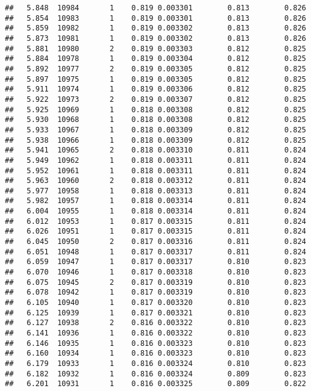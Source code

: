 \documentclass[
]{book}
\begin{document}
\begin{verbatim}
##   5.848  10984       1    0.819 0.003301        0.813        0.826
##   5.854  10983       1    0.819 0.003301        0.813        0.826
##   5.859  10982       1    0.819 0.003302        0.813        0.826
##   5.873  10981       1    0.819 0.003302        0.813        0.826
##   5.881  10980       2    0.819 0.003303        0.812        0.825
##   5.884  10978       1    0.819 0.003304        0.812        0.825
##   5.892  10977       2    0.819 0.003305        0.812        0.825
##   5.897  10975       1    0.819 0.003305        0.812        0.825
##   5.911  10974       1    0.819 0.003306        0.812        0.825
##   5.922  10973       2    0.819 0.003307        0.812        0.825
##   5.925  10969       1    0.818 0.003308        0.812        0.825
##   5.930  10968       1    0.818 0.003308        0.812        0.825
##   5.933  10967       1    0.818 0.003309        0.812        0.825
##   5.938  10966       1    0.818 0.003309        0.812        0.825
##   5.941  10965       2    0.818 0.003310        0.811        0.824
##   5.949  10962       1    0.818 0.003311        0.811        0.824
##   5.952  10961       1    0.818 0.003311        0.811        0.824
##   5.963  10960       2    0.818 0.003312        0.811        0.824
##   5.977  10958       1    0.818 0.003313        0.811        0.824
##   5.982  10957       1    0.818 0.003314        0.811        0.824
##   6.004  10955       1    0.818 0.003314        0.811        0.824
##   6.012  10953       1    0.817 0.003315        0.811        0.824
##   6.026  10951       1    0.817 0.003315        0.811        0.824
##   6.045  10950       2    0.817 0.003316        0.811        0.824
##   6.051  10948       1    0.817 0.003317        0.811        0.824
##   6.059  10947       1    0.817 0.003317        0.810        0.823
##   6.070  10946       1    0.817 0.003318        0.810        0.823
##   6.075  10945       2    0.817 0.003319        0.810        0.823
##   6.078  10942       1    0.817 0.003319        0.810        0.823
##   6.105  10940       1    0.817 0.003320        0.810        0.823
##   6.125  10939       1    0.817 0.003321        0.810        0.823
##   6.127  10938       2    0.816 0.003322        0.810        0.823
##   6.141  10936       1    0.816 0.003322        0.810        0.823
##   6.146  10935       1    0.816 0.003323        0.810        0.823
##   6.160  10934       1    0.816 0.003323        0.810        0.823
##   6.179  10933       1    0.816 0.003324        0.810        0.823
##   6.182  10932       1    0.816 0.003324        0.809        0.823
##   6.201  10931       1    0.816 0.003325        0.809        0.822

\end{verbatim}
\end{document}
